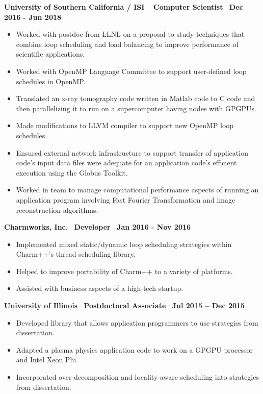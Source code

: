 \textbf{University of Southern California / ISI $\>$$\>$$\>$$\>$Computer Scientist$\>$$\>$$\>$$\>$Dec 2016 - Jun 2018}
\vspace*{-0.0in} 
\begin{itemize}
\item Worked with postdoc from LLNL on a proposal to study
techniques that combine loop scheduling and load balancing to improve
performance of scientific applications.
\item Worked with OpenMP Language Committee to support user-defined loop schedules in OpenMP.
\item Translated an x-ray tomography code written in
Matlab code to C code and then parallelizing it to run on a supercomputer
having nodes with GPGPUs. 
\item Made modifications to LLVM compiler to support new OpenMP loop schedules. 
\item Ensured external network infrastructure to support transfer of application code's input data files were adequate
for an application code's efficient execution using the Globus Toolkit. 
\item Worked in team to manage computational performance aspects of running an application program involving Fast Fourier Transformation and image reconstruction algorithms. 
\end{itemize}

\textbf{Charmworks, Inc.$\>$$\>$$\>$$\>$Developer$\>$$\>$$\>$$\>$Jan 2016 - Nov 2016}
\vspace*{-0.0in}
\begin{itemize}
\item Implemented mixed static/dynamic loop scheduling
strategies within Charm++'s thread scheduling library.
\item Helped to improve portability of Charm++ to a variety of platforms. 
\item Assisted with business aspects of a high-tech startup. 
\end{itemize} 

\textbf{ University of Illinois$\>$$\>$$\>$$\>$Postdoctoral Associate$\>$$\>$$\>$$\>$Jul 2015 – Dec 2015}
\vspace*{-0.0in}
\begin{itemize} 
\item Developed library that allows application programmers to use strategies from dissertation.
\item Adapted a plasma physics application code to work on a
GPGPU processor and Intel Xeon Phi.
\item Incorporated over-decomposition and locality-aware scheduling into strategies from dissertation.
\end{itemize}

